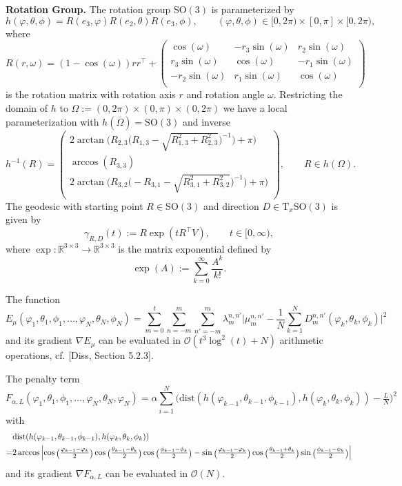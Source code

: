 \documentclass[%
a4paper,11pt,DIV=11,%
abstract=on%
]{scrartcl}
\begin{document}
\textbf{Rotation Group.} The rotation group $\mathrm{SO(3)}$ is parameterized by
\[
  h(\varphi,\theta,\phi) = R(e_{3},\varphi) R(e_{2},\theta) R(e_{3},\phi), \qquad (\varphi,\theta,\phi) \in [0,2\pi)\times [0,\pi] \times [0,2\pi),
\]
where 
\[
  R(r,\omega) = (1-\cos(\omega))rr^{\top} + 
\begin{pmatrix}
 \cos(\omega) & - r_{3} \sin(\omega) & r_{2} \sin(\omega) \\
r_{3} \sin(\omega) & \cos(\omega) & -r_{1} \sin(\omega) \\
- r_{2} \sin(\omega) &  r_{1} \sin(\omega) & \cos(\omega)  \\
\end{pmatrix}
\]
is the rotation matrix with rotation axis $r$ and rotation angle $\omega$. Restricting the domain of $h$ to $\Omega := (0,2\pi) \times (0,\pi) \times (0,2\pi)$ we have a local parameterization with $h(\overline \Omega)= \mathrm{SO(3)}$ and inverse
\[
  h^{-1}(R) = 
\begin{pmatrix}
  2 \arctan( R_{2,3} \Big(R_{1,3} - \sqrt{R_{1,3}^{2}+R_{2,3}^{2}}\Big)^{-1} \Big) + \pi \big) \\
  \arccos(R_{3,3})\\
  2 \arctan( R_{3,2} \Big(- R_{3,1} - \sqrt{R_{3,1}^{2}+R_{3,2}^{2}}\Big)^{-1} \Big) + \pi \big) \\
\end{pmatrix}, \qquad R \in h(\Omega).
\]
The geodesic with starting point $R \in \mathrm{SO(3)}$ and direction $D \in \mathrm T_{x}\mathrm{SO(3)}$ is given by
\[
  \gamma_{R,D}(t) :=  R \exp( t R^{\top} V), \qquad t \in [0,\infty),
\]
where $\exp:\mathbb R^{3\times 3} \to \mathbb R^{3\times 3}$ is the matrix exponential defined by
\[
  \exp(A) := \sum_{k=0}^{\infty} \frac{A^{k}}{k!}.
\]

The function
\[
  E_{\mu}(\varphi_{1},\theta_{1},\phi_{1},\dots,\varphi_{N},\theta_{N},\phi_{N}) = \sum_{m=0}^{t} \sum_{n=-m}^{m} \sum_{n'=-m}^{m}\lambda_{m}^{n,n'} \Big| \mu_{m}^{n,n'} - \frac 1N \sum_{k=1}^{N} D_{m}^{n,n'}(\varphi_{k},\theta_{k},\phi_{k})\Big|^{2}
\]
and its gradient $\nabla E_{\mu}$ can be evaluated in $\mathcal O(t^{3} \log^{2}(t) + N)$ arithmetic operations, cf. {\color{blue}[Diss, Section 5.2.3]}.

The penalty term
\[
  F_{\alpha,L}(\varphi_{1},\theta_{1},\phi_{1},\dots,\varphi_{N},\theta_{N},\varphi_{N}) = \alpha \sum_{i=1}^{N} \big(  \mathrm{dist}(h(\varphi_{k-1},\theta_{k-1},\phi_{k-1}),h(\varphi_{k},\theta_{k},\phi_{k})) - \tfrac{L}{N}\big)^{2}
\]
with
\[
  \begin{aligned}
    & \mathrm{dist}(h(\varphi_{k-1},\theta_{k-1},\phi_{k-1}),h(\varphi_{k},\theta_{k},\phi_{k})) \\
    =&  {\tiny 2 \arccos\left| \cos\Big(\tfrac{\varphi_{k-1}-\varphi_{k}}{2}\Big) \cos\Big(\tfrac{\theta_{k-1}-\theta_{k}}{2}\Big)  \cos\Big(\tfrac{\phi_{k-1}-\phi_{k}}{2}\Big) - \sin\Big(\tfrac{\varphi_{k-1}-\varphi_{k}}{2}\Big) \cos\Big(\tfrac{\theta_{k-1}+\theta_{k}}{2}\Big)  \sin\Big(\tfrac{\phi_{k-1}-\phi_{k}}{2}\Big) \right|}
\end{aligned}
\]
and its gradient $\nabla F_{\alpha,L}$ can be evaluated in $\mathcal O(N)$.
\end{document}
